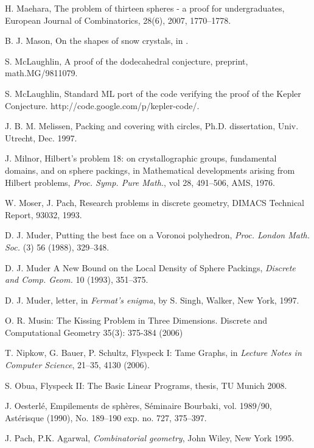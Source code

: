 \begin{thebibliography}{CHMS94}
 H. Maehara, The problem of thirteen spheres - a proof for undergraduates, European Journal of Combinatorics, 28(6), 2007,
1770--1778.

 B. J. Mason, On the shapes of snow crystals, in \cite{Kep66}.

 S. McLaughlin, A proof of the dodecahedral conjecture,
    preprint, math.MG/9811079.

 S. McLaughlin, Standard ML port of the code
verifying the proof of the Kepler Conjecture.
http://code.google.com/p/kepler-code/.

 J. B. M. Melissen, Packing and covering with circles,
    Ph.D. dissertation, Univ. Utrecht, Dec. 1997.

 J. Milnor, Hilbert's problem 18: on crystallographic groups,
    fundamental domains, and on sphere packings, in
    Mathematical developments arising from Hilbert problems,
    {\it Proc. Symp. Pure Math.}, vol 28, 491--506, AMS, 1976.

 W. Moser, J. Pach, Research problems in discrete geometry,
    DIMACS Technical Report, 93032, 1993.

 D. J. Muder, Putting the best face on a Voronoi polyhedron,
    {\it Proc. London Math. Soc.} (3) 56 (1988), 329--348.


  D. J. Muder A New Bound on the Local Density
of Sphere Packings, {\it Discrete and Comp. Geom.} 10 (1993),
351--375.

  D. J. Muder, letter, in {\it Fermat's enigma}, by S. Singh,
        Walker, New York, 1997.

  O. R. Musin: The Kissing Problem in Three Dimensions. Discrete and Computational Geometry 35(3): 375-384 (2006)

  T. Nipkow, G. Bauer, P. Schultz, Flyspeck I: Tame Graphs, in
{\it Lecture Notes in Computer Science}, 21--35, 4130 (2006). 

  S. Obua, Flyspeck II: The Basic Linear Programs,
thesis, TU Munich 2008.

 J. Oesterl\'e,  Empilements de sph\`eres,
    S\'eminaire Bourbaki, vol. 1989/90, Ast\'erisque (1990),
        No. 189--190 exp. no. 727, 375--397.

 J. Pach, P.K. Agarwal, {\it Combinatorial geometry}, John Wiley,
    New York 1995.


\end{thebibliography}
